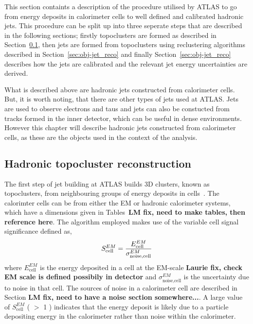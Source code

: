 This section containts a description of the procedure utilised by ATLAS
to go from energy deposits in calorimeter cells to well defined and calibrated hadronic jets.
This procedure can be split up into three seperate steps that are described in the following sections;
firstly topoclusters are formed as described in Section~\ref{sec:obj-jet_topo},
then jets are formed from topoclusters using reclustering algorithms described in Section~\ref{sec:obj-jet_reco}
and finally Section~\ref{sec:obj-jet_reco} describes how the jets are calibrated and the relevant jet energy uncertainties are derived.

What is described above are hadronic jets constructed from calorimeter cells.
But, it is worth noting, that there are other types of jets used at ATLAS.
Jets are used to observe electrons and taus and 
jets can also be constucted from tracks formed in the inner detector, which can be useful in dense environments.
However this chapter will describe hadronic jets constructed from calorimeter cells,
as these are the objects used in the context of the analysis.

\subsection{Hadronic topocluster reconstruction}
\label{sec:obj-jet_topo}

The first step of jet building at ATLAS builds 3D clusters, known as topoclusters, from neighbouring groups of energy deposits in cells~\cite{obj-jet_topo}.
The calorimter cells can be from either the EM or hadronic calorimeter systems,
which have a dimensions given in Tables~\textbf{LM fix, need to make tables, then reference here}.
The algorithm employed makes use of the variable cell signal significance defined as, 
\begin{equation}
  \Large{S_{\text{cell}}^{EM} = \frac{E_{\text{cell}}^{EM}}{\sigma_{\text{noise,cell}}^{EM}}}
\end{equation}
where $E_{\text{cell}}^{EM}$ is the energy deposited in a cell at the EM-scale \textbf{Laurie fix, check EM scale is defined possibily in detector}
and $\sigma_{\text{noise,cell}}^{EM}$ is the uncertainty due to noise in that cell.
The sources of noise in a calorimeter cell are described in Section \textbf{LM fix, need to have a noise section somewhere...}.
A large value of $S_{\text{cell}}^{EM}$ ( $>$ 1 ) indicates that the energy deposit is likely due to a particle
depositing energy in the calorimeter rather than noise within the calorimeter.


